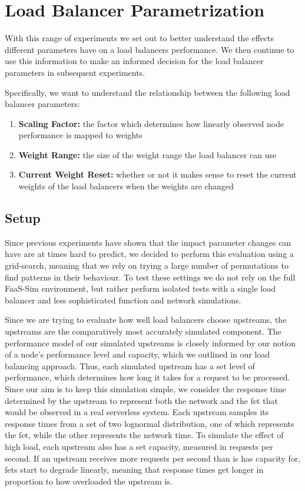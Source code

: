 \section{Load Balancer Parametrization}
With this range of experiments we set out to better understand the effects different parameters have on a load balancers performance.
We then continue to use this information to make an informed decision for the load balancer parameters in subsequent experiments.

Specifically, we want to understand the relationship between the following load balancer parameters:
\begin{enumerate}
    \item \textbf{Scaling Factor:} the factor which determines how linearly observed node performance is mapped to weights
    \item \textbf{Weight Range:} the size of the weight range the load balancer can use
    \item \textbf{Current Weight Reset:} whether or not it makes sense to reset the current weights of the load balancers when the weights are changed
\end{enumerate}

\subsection{Setup}

Since previous experiments have shown that the impact parameter changes can have are at times hard to predict, we decided to perform this evaluation using a grid-search, meaning that we rely on trying a large number of permutations to find patterns in their behaviour.
To test these settings we do not rely on the full FaaS-Sim environment, but rather perform isolated tests with a single load balancer and less sophisticated function and network simulations.

Since we are trying to evaluate how well load balancers choose upstreams, the upstreams are the comparatively most accurately simulated component.
The performance model of our simulated upstreams is closely informed by our notion of a node's performance level and capacity, which we outlined in our load balancing approach.
Thus, each simulated upstream has a set level of performance, which determines how long it takes for a request to be processed.
Since our aim is to keep this simulation simple, we consider the response time determined by the upstream to represent both the network and the \gls{fet} that would be observed in a real serverless system.
Each upstream samples its response times from a set of two lognormal distribution, one of which represents the \gls{fet}, while the other represents the network time.
To simulate the effect of high load, each upstream also has a set capacity, measured in requests per second.
If an upstream receives more requests per second than is has capacity for, \glspl{fet} start to degrade linearly, meaning that response times get longer in proportion to how overloaded the upstream is.

